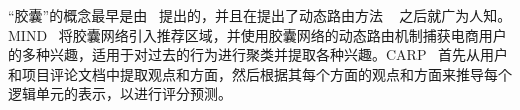 “胶囊”的概念最早是由~\cite{hinton2011transforming} 提出的，并且在提出了动态路由方法 ~\cite{sabour2017dynamic} 之后就广为人知。
MIND~\cite{li2019multi} 将胶囊网络引入推荐区域，并使用胶囊网络的动态路由机制捕获电商用户的多种兴趣，适用于对过去的行为进行聚类并提取各种兴趣。CARP~\cite{li2019capsule} 首先从用户和项目评论文档中提取观点和方面，然后根据其每个方面的观点和方面来推导每个逻辑单元的表示，以进行评分预测。

